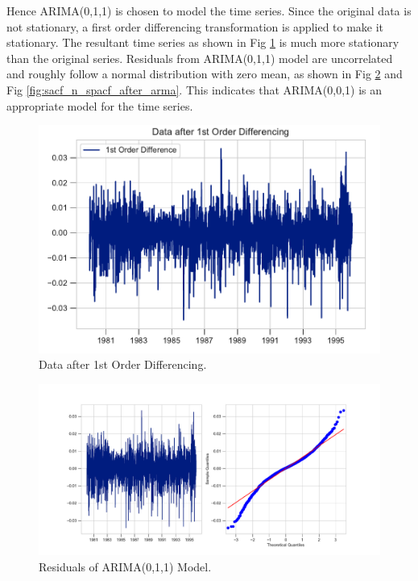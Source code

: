 \documentclass[]{article}
\begin{document}
Hence ARIMA(0,1,1) is chosen to model the time series. Since the original data is not stationary, a first order differencing transformation is applied to make it stationary. The resultant time series as shown in Fig \ref{fig:data_1_d} is much more stationary than the original series. Residuals from ARIMA(0,1,1) model are uncorrelated and roughly follow a normal distribution with zero mean, as shown in Fig \ref{fig:res_after_arma} and Fig \ref{fig:sacf_n_spacf_after_arma}. This indicates that ARIMA(0,0,1) is an appropriate model for the time series. 
%
\begin{figure}[hbtp]
	\centering
	\includegraphics[width=1\columnwidth]{../Figures/data_1_d.pdf}
	\caption{Data after 1st Order Differencing.}
	\label{fig:data_1_d}
\end{figure}
%
%
\begin{figure}[hbtp]
	\centering
	\includegraphics[width=1\columnwidth]{../Figures/res_after_arma.pdf}
	\caption{Residuals of ARIMA(0,1,1) Model.}
	\label{fig:res_after_arma}
\end{figure}
%
%
\end{document}
